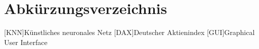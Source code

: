 
\tableofcontents
\listoffigures
\listoftables
\listofformels

\chapter*{Abkürzungsverzeichnis}

\begin{acronym}[SEPSEP]
[KNN]{Künstliches neuronales Netz}
[DAX]{Deutscher Aktienindex}
[GUI]{Graphical User Interface}
\end{acronym}  
 

\clearpage
{} 
